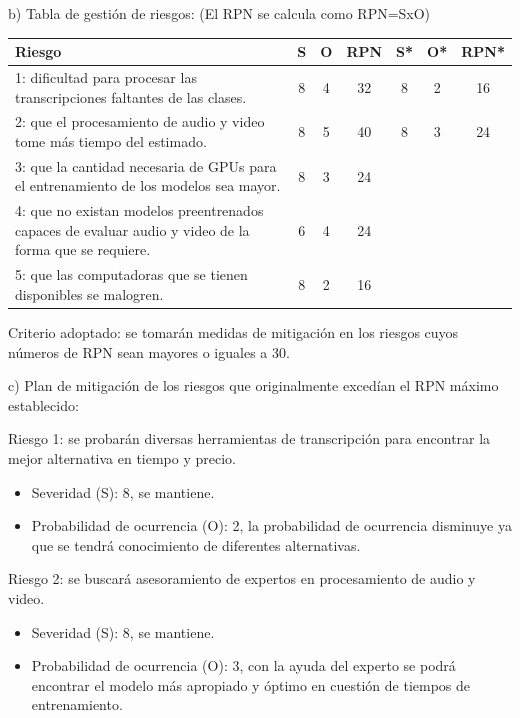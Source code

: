 \documentclass[
11pt, %
codirector, %
]{charter}
\begin{document}
b) Tabla de gestión de riesgos:      (El RPN se calcula como RPN=SxO)

\begin{table}[htpb]
\centering
\begin{tabularx}{\linewidth}{@{}|X|c|c|c|c|c|c|@{}}
\hline
\rowcolor[HTML]{C0C0C0} 
Riesgo & S & O & RPN & S* & O* & RPN* \\ \hline
      1: dificultad para procesar las transcripciones faltantes de las clases. &  8 &  4 &   32 &  8 &  2 & 16   \\ \hline
      2: que el procesamiento de audio y video tome más tiempo del estimado. &  8 &  5 &   40 &  8 &  3 & 24   \\ \hline
      3: que la cantidad necesaria de GPUs para el entrenamiento de los modelos sea mayor. &  8 &  3 &   24 &   &   &     \\ \hline
      4: que no existan modelos preentrenados capaces de evaluar audio y video de la forma que se requiere. &  6 &  4 &   24 &    &    &      \\ \hline
      5: que las computadoras que se tienen disponibles se malogren. &  8 &  2 &   16 &    &    &      \\ \hline
\end{tabularx}%
\end{table}

Criterio adoptado: 
se tomarán medidas de mitigación en los riesgos cuyos números de RPN sean mayores o iguales a 30.

c) Plan de mitigación de los riesgos que originalmente excedían el RPN máximo establecido:
 
Riesgo 1: se probarán diversas herramientas de transcripción para encontrar la mejor alternativa en tiempo y precio.
\begin{itemize}
  \item Severidad (S): 8, se mantiene.
  \item Probabilidad de ocurrencia (O): 2, la probabilidad de ocurrencia disminuye ya que se tendrá conocimiento de diferentes alternativas.
\end{itemize}

Riesgo 2: se buscará asesoramiento de expertos en procesamiento de audio y video.
\begin{itemize}
  \item Severidad (S): 8, se mantiene.
  \item Probabilidad de ocurrencia (O): 3, con la ayuda del experto se podrá encontrar el modelo más apropiado y óptimo en cuestión de tiempos de entrenamiento.
\end{itemize}
 
\end{document}
